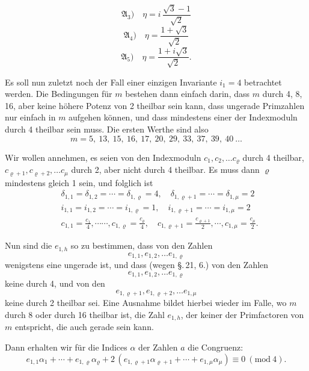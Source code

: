 \[ \mathfrak{A}_3)\quad \eta = i\,\frac{\sqrt{3}-1}{\sqrt{2}} \]
\[ \mathfrak{A}_4)\quad \eta = \frac{1+\sqrt{3}}{\sqrt{2}} \]
\[ \mathfrak{A}_5)\quad \eta = \frac{1+i\sqrt{3}}{\sqrt{2}}. \]

Es soll nun zuletzt noch der Fall einer einzigen Invariante
$i_1 = 4$ betrachtet werden. Die Bedingungen für $m$ bestehen
dann einfach darin, dass $m$ durch 4, 8, 16, aber keine höhere
Potenz von 2 theilbar sein kann, dass ungerade Primzahlen nur
einfach in $m$ aufgehen können, und dass mindestens einer der
Indexmoduln durch 4 theilbar sein muss. Die ersten Werthe
sind also
\[ m = 5,\ 13,\ 15,\ 16,\ 17,\ 20,\ 29,\ 33,\ 37,\ 39,\ 40\ \ldots \]

Wir wollen annehmen, es seien von den Indexmoduln
$c_1, c_2, \ldots c_\varrho$ durch 4 theilbar, $c_{\varrho+1}, c_{\varrho+2}, \ldots c_\mu$ durch 2, aber
nicht durch 4 theilbar. Es muss dann $\varrho$ mindestens gleich 1
sein, und folglich ist
\[ \begin{aligned}
&\delta_{1,1} = \delta_{1,2} = \cdots = \delta_{1,\varrho} = 4, \quad \delta_{1,\varrho+1} = \cdots = \delta_{1,\mu} = 2\\
&i_{1,1} = i_{1,2} = \cdots = i_{1,\varrho} = 1, \quad i_{1,\varrho+1} = \cdots = i_{1,\mu} = 2\\
&c_{1,1} = \frac{c_1}{4}, \cdots\cdots, c_{1,\varrho} = \frac{c_\varrho}{4}, \quad c_{1,\varrho+1} = \frac{c_{\varrho+1}}{2}, \cdots, c_{1,\mu} = \frac{c_\mu}{2}.
\end{aligned} \]

Nun sind die $e_{1,h}$ so zu bestimmen, dass von den Zahlen
\[ e_{1,1}, e_{1,2}, \ldots e_{1,\varrho} \]
wenigstens eine ungerade ist, und dass (wegen \S.\,21, 6.) von den
Zahlen
\[ e_{1,1}, e_{1,2}, \ldots e_{1,\varrho} \]
keine durch 4, und von den
\[ e_{1,\varrho+1}, e_{1,\varrho+2}, \ldots e_{1,\mu} \]
keine durch 2 theilbar sei. Eine Ausnahme bildet hierbei wieder
im Falle, wo $m$ durch 8 oder durch 16 theilbar ist, die Zahl $e_{1,h}$,
der keiner der Primfactoren von $m$ entspricht, die auch gerade
sein kann.

Dann erhalten wir für die Indices $\alpha$ der Zahlen $a$ die Congruenz:
\[ e_{1,1}\alpha_1 + \cdots + e_{1,\varrho}\alpha_\varrho + 2\,(e_{1,\varrho+1}\alpha_{\varrho+1} + \cdots + e_{1,\mu}\alpha_\mu) \equiv 0\ (\mathrm{mod}\ 4). \]
